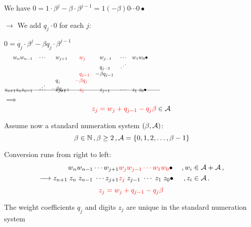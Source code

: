     We have $0=1\cdot \beta^j -\beta \cdot \beta^{j-1}=1 (-\!\beta) 0 \cdots 0\bullet $ 
    
    $\rightarrow$ We add $q_j\cdot 0$ for each $j$:
    
    $0=q_j\cdot \beta^j -\beta  q_j \cdot \beta^{j-1}$
    \begin{align*}
        w_n w_{n-1}&&&\cdots& &w_{j+1}&\!\! &\textcolor{red}{w_j}  & \!\!  &w_{j-1} &&\cdots &&w_1 w_0\bullet \hspace{200pt}\\[-5pt]
                   &&&&       &       & &     &   &q_{j-2} &&\iddots\\[-3pt] 
                   &&&&       &       & &\textcolor{red}{q_{j-1}}& -&\beta q_{j-1} \\[-3pt]
                   &&&&         &q_j&   \textcolor{red}{-}&\textcolor{red}{\beta q_j} &&\\[-8pt]
                   &&&  \iddots      &   -&\beta q_{j+1}&   &\ &&\\[-17pt]
    \intertext{\line(1,0){280}}
    \vspace{-15pt}
    \\[-30pt]
     z_{n+1} z_{n} z_{n-1}&&&\cdots& &z_{j+1}& &\textcolor{red}{z_j}& &z_{j-1} &&\cdots &&z_1 \; z_0\bullet                            
    \end{align*}
    $\implies$
    $$
        \textcolor{red}{z_j=w_j + q_{j-1} - q_j \beta} \in \mathcal{A}\,
    $$
        
%     





  Assume now a standard numeration system $(\beta, \mathcal{A})$:
  $$
    \beta \in \mathbb{N}\,,\beta  \geq 2\,, \mathcal{A} = \{0, 1, 2,\dots, \beta -1 \}
  $$ 
  
  Conversion runs from right to left:
  \begin{align*}
    w_n w_{n-1}\cdots w_{j+1}& \textcolor{red}{w_j w_{j-1} \cdots w_1 w_0}\bullet& \,,w_i &\in \mathcal{A}+\mathcal{A}\,,    \\
    \longrightarrow z_{n+1}\; z_{n}\; z_{n-1}\;\cdots z_{j+1} &\textcolor{red}{z_j} \; z_{j-1}\; \cdots \;z_1 \; z_0\bullet& \,,z_i &\in \mathcal{A}\,.
  \end{align*}
    $$
        \textcolor{red}{z_j=w_j + q_{j-1} - q_j \beta}\,
    $$
   
  
    The weight coefficients $q_j$ and digits $z_j$ are unique in the standard numeration system 
    
